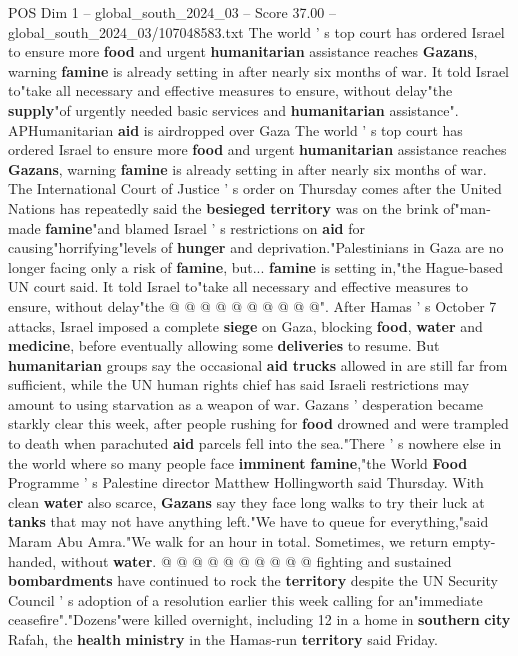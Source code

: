 \begin{textsample}{POS Dim 1 – global\_south\_2024\_03 – Score 37.00 – global\_south\_2024\_03/107048583.txt}  \label{ex:f1_pos_004}
The world ' s top court has ordered Israel to ensure more \textbf{food} and urgent \textbf{humanitarian} assistance reaches \textbf{Gazans}, warning \textbf{famine} is already setting in after nearly six months of war.
It told Israel to"take all necessary and effective measures to ensure, without delay"the \textbf{supply}"of urgently needed basic services and \textbf{humanitarian} assistance".
APHumanitarian \textbf{aid} is airdropped over Gaza The world ' s top court has ordered Israel to ensure more \textbf{food} and urgent \textbf{humanitarian} assistance reaches \textbf{Gazans}, warning \textbf{famine} is already setting in after nearly six months of war.
The International Court of Justice ' s order on Thursday comes after the United Nations has repeatedly said the \textbf{besieged} \textbf{territory} was on the brink of"man-made \textbf{famine}"and blamed Israel ' s restrictions on \textbf{aid} for causing"horrifying"levels of \textbf{hunger} and deprivation."Palestinians in Gaza are no longer facing only a risk of \textbf{famine}, but... \textbf{famine} is setting in,"the Hague-based UN court said.
It told Israel to"take all necessary and effective measures to ensure, without delay"the @ @ @ @ @ @ @ @ @ @".
After Hamas ' s October 7 attacks, Israel imposed a complete \textbf{siege} on Gaza, blocking \textbf{food}, \textbf{water} and \textbf{medicine}, before eventually allowing some \textbf{deliveries} to resume.
But \textbf{humanitarian} groups say the occasional \textbf{aid} \textbf{trucks} allowed in are still far from sufficient, while the UN human rights chief has said Israeli restrictions may amount to using starvation as a weapon of war.
Gazans ' desperation became starkly clear this week, after people rushing for \textbf{food} drowned and were trampled to death when parachuted \textbf{aid} parcels fell into the sea."There ' s nowhere else in the world where so many people face \textbf{imminent} \textbf{famine},"the World \textbf{Food} Programme ' s Palestine director Matthew Hollingworth said Thursday.
With clean \textbf{water} also scarce, \textbf{Gazans} say they face long walks to try their luck at \textbf{tanks} that may not have anything left."We have to queue for everything,"said Maram Abu Amra."We walk for an hour in total.
Sometimes, we return empty-handed, without \textbf{water}. @ @ @ @ @ @ @ @ @ @ fighting and sustained \textbf{bombardments} have continued to rock the \textbf{territory} despite the UN Security Council ' s adoption of a resolution earlier this week calling for an"immediate ceasefire"."Dozens"were killed overnight, including 12 in a home in \textbf{southern} \textbf{city} Rafah, the \textbf{health} \textbf{ministry} in the Hamas-run \textbf{territory} said Friday.

\end{textsample}
